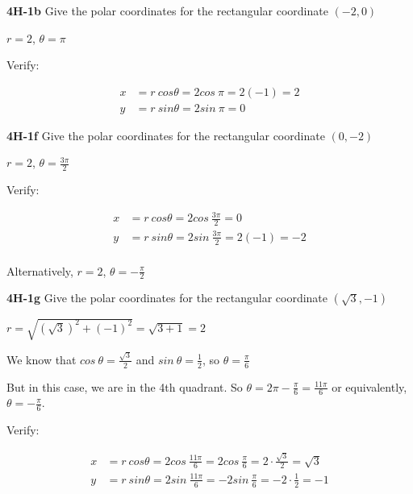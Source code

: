 \documentclass[9pt]{article}
\begin{document}
\begin{tcolorbox}
  \textbf{4H-1b} Give the polar coordinates for the rectangular coordinate $(-2, 0)$
\end{tcolorbox}

$r = 2$, $\theta = \pi$

Verify:

\begin{align*}
  x &= r\ cos \theta = 2 cos\ \pi = 2(-1) = 2 \\
  y &= r\ sin \theta = 2 sin\ \pi = 0
\end{align*}


\begin{tcolorbox}
  \textbf{4H-1f} Give the polar coordinates for the rectangular coordinate $(0, -2)$
\end{tcolorbox}

$r = 2$, $\theta = \frac{3\pi}{2}$

Verify:

\begin{align*}
  x &= r\ cos \theta = 2 cos\ \frac{3\pi}{2} = 0 \\
  y &= r\ sin \theta = 2 sin\ \frac{3\pi}{2} = 2(-1) = -2 \\
\end{align*}

Alternatively, $r = 2$, $\theta = -\frac{\pi}{2}$


\begin{tcolorbox}
  \textbf{4H-1g} Give the polar coordinates for the rectangular coordinate $(\sqrt{3}, -1)$
\end{tcolorbox}

$r = \sqrt{(\sqrt{3})^2 + (-1)^2} = \sqrt{3 + 1} = 2$

We know that $cos\ \theta = \frac{\sqrt{3}}{2}$ and $sin\ \theta = \frac{1}{2}$, so $\theta = \frac{\pi}{6}$

But in this case, we are in the 4th quadrant. So $\theta = 2 \pi - \frac{\pi}{6} = \frac{11 \pi}{6}$ or equivalently, $\theta = -\frac{\pi}{6}$.

Verify:

\begin{align*}
  x &= r\ cos \theta = 2 cos\ \frac{11\pi}{6} = 2 cos\ \frac{\pi}{6} = 2 \cdot \frac{\sqrt{3}}{2} = \sqrt{3} \\
  y &= r\ sin \theta = 2 sin\ \frac{11\pi}{6} = -2 sin\ \frac{\pi}{6} = -2 \cdot \frac{1}{2} = -1
\end{align*}
\end{document}
